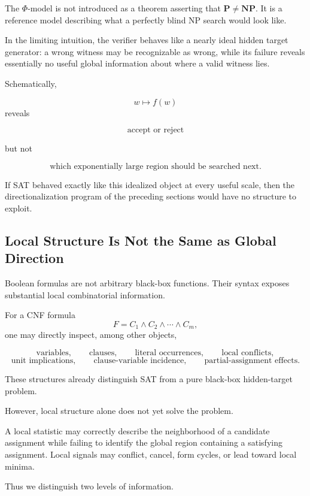 \documentclass[11pt]{article}
\theoremstyle{plain}
\theoremstyle{definition}
\begin{document}
The \(\Phi\)-model is not introduced as a theorem asserting that
\(\mathbf{P}\neq\mathbf{NP}\).  It is a reference model describing what a
perfectly blind NP search would look like.

In the limiting intuition, the verifier behaves like a nearly ideal hidden
target generator: a wrong witness may be recognizable as wrong, while its
failure reveals essentially no useful global information about where a valid
witness lies.

Schematically,

\[
    w
    \longmapsto
    f(w)
\]
reveals

\[
    \boxed{
    \text{accept or reject}
    }
\]

but not

\[
    \boxed{
    \text{which exponentially large region should be searched next}.
    }
\]

If SAT behaved exactly like this idealized object at every useful scale, then
the directionalization program of the preceding sections would have no
structure to exploit.

\subsection{Local Structure Is Not the Same as Global Direction}

Boolean formulas are not arbitrary black-box functions.  Their syntax exposes
substantial local combinatorial information.

For a CNF formula
\[
    F=C_1\land C_2\land\cdots\land C_m,
\]
one may directly inspect, among other objects,

\[
    \text{variables},\qquad
    \text{clauses},\qquad
    \text{literal occurrences},\qquad
    \text{local conflicts},
\]
\[
    \text{unit implications},\qquad
    \text{clause-variable incidence},\qquad
    \text{partial-assignment effects}.
\]

These structures already distinguish SAT from a pure black-box hidden-target
problem.

However, local structure alone does not yet solve the problem.

A local statistic may correctly describe the neighborhood of a candidate
assignment while failing to identify the global region containing a
satisfying assignment.  Local signals may conflict, cancel, form cycles, or
lead toward local minima.

Thus we distinguish two levels of information.
\end{document}
